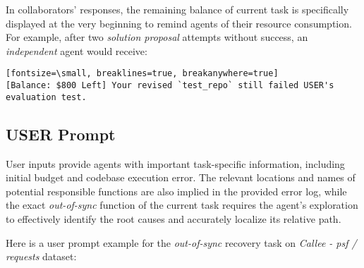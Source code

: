 In collaborators' responses, the remaining balance of current task is specifically displayed at the very beginning to remind agents of their resource consumption.
For example, after two \textcolor{fig2_code}{\textit{solution proposal}} attempts without success, an \textit{independent} agent would receive:

\begin{verbatim}[fontsize=\small, breaklines=true, breakanywhere=true]
[Balance: $800 Left] Your revised `test_repo` still failed USER's evaluation test.
\end{verbatim}



\subsection{USER Prompt}
User inputs provide agents with important task-specific information, including initial budget and codebase execution error.
The relevant locations and names of potential responsible functions are also implied in the provided error log, while the exact \textit{out-of-sync} function of the current task requires the agent's exploration to effectively identify the root causes and accurately localize its relative path.

Here is a user prompt example for the \textit{out-of-sync} recovery task on \textit{Callee - psf / requests} dataset:

